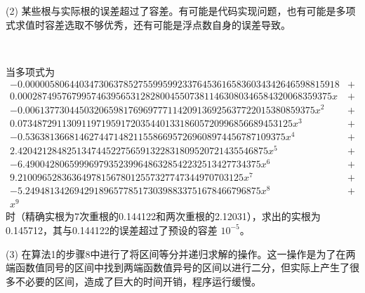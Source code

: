 (2) 某些根与实际根的误差超过了容差。有可能是代码实现问题，也有可能是多项式求值时容差选取不够优秀，还有可能是浮点数自身的误差导致。

\begin{example}[]~
	
	当多项式为
	$$
	\begin{aligned}
	-0.0000058064403473063785275599599233764536165836034342646598815918 & + \\ 0.0002874957679957463956531282800455073811463080346584320068359375x & + \\ -0.00613773044503206598176969777114209136925637722015380859375x^2 & + \\ 0.07348729113091197195917203544013318605720996856689453125x^3 & + \\ -0.53638136681462744714821155866957269608974456787109375x^4 & + \\ 2.420421284825134744522756591322831809520721435546875x^5 & + \\ -6.490042806599969793523996486328542232513427734375x^6 & + \\ 9.2100965283636497815678012557327747344970703125x^7 & + \\ -5.249481342694291896577851730398833751678466796875x^8 & + \\ 
	x^9
	\end{aligned}	
	$$
	时（精确实根为7次重根的0.144122和两次重根的2.12031），求出的实根为0.145712，其与0.144122的误差超过了预设的容差 $10 ^ {-5}$。
	
	
\end{example}

(3) 在算法1的步骤8中进行了将区间等分并递归求解的操作。这一操作是为了在两端函数值同号的区间中找到两端函数值异号的区间以进行二分，但实际上产生了很多不必要的区间，造成了巨大的时间开销，程序运行缓慢。
